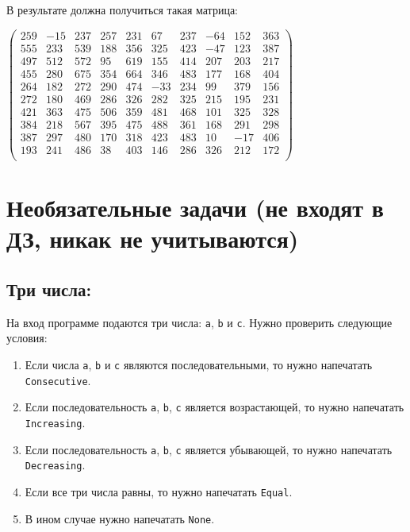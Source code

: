 \documentclass{article}
\begin{document}
В результате должна получиться такая матрица:
\begin{center}
$
\begin{pmatrix}
259 & -15 & 237 & 257 &  231 &  67  & 237  & -64  & 152  & 363 \\
555 & 233 & 539 & 188 &  356 &  325 &  423 &  -47 &  123 &  387 \\
497 & 512 & 572 & 95  & 619  & 155  & 414  & 207  & 203  & 217 \\
455 & 280 & 675 & 354 &  664 &  346 &  483 &  177 &  168 &  404 \\
264 & 182 & 272 & 290 &  474 &  -33 &  234 &  99  & 379  & 156 \\
272 & 180 & 469 & 286 &  326 &  282 &  325 &  215 &  195 &  231 \\
421 & 363 & 475 & 506 &  359 &  481 &  468 &  101 &  325 &  328 \\
384 & 218 & 567 & 395 &  475 &  488 &  361 &  168 &  291 &  298 \\
387 & 297 & 480 & 170 &  318 &  423 &  483 &  10  & -17  & 406 \\
193 & 241 & 486 & 38  & 403  & 146  & 286  & 326  & 212  & 172 \\
\end{pmatrix}
$
\end{center}










\newpage
\section*{Необязательные задачи (не входят в ДЗ, никак не учитываются)}
\setcounter{subsection}{0}

\subsection{Три числа:}
На вход программе подаются три числа: \texttt{a}, \texttt{b} и \texttt{c}. Нужно проверить следующие условия:
\begin{enumerate}
\item Если числа \texttt{a}, \texttt{b} и \texttt{c} являются последовательными, то нужно напечатать \texttt{Consecutive}.
\item Если последовательность \texttt{a}, \texttt{b}, \texttt{c} является возрастающей, то нужно напечатать \texttt{Increasing}.
\item Если последовательность \texttt{a}, \texttt{b}, \texttt{c} является убывающей, то нужно напечатать \texttt{Decreasing}.
\item Если все три числа равны, то нужно напечатать \texttt{Equal}.
\item В ином случае нужно напечатать \texttt{None}.
\end{enumerate}
\end{document}
